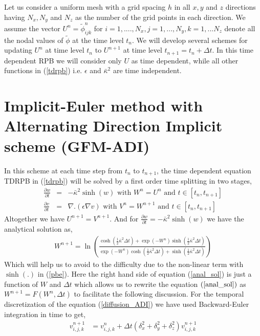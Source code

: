 Let us consider a uniform mesh with a grid spacing $h$ in all $x,y$ and $z$ directions having $N_x,N_y$ and $N_z$ as the number of the grid points in each direction. We assume the vector $U^n={\tilde\phi^n_{ijk}}$ for $i=1,...., N_x,j=1,...,N_y,k=1,...N_z$ denote all the nodal values of $\tilde\phi$ at the time level $t_n$. We will develop several schemes for updating $U^n$ at time level $t_n$ to $U^{n+1}$ at time level $t_{n+1}=t_n+ \Delta t $. In this time dependent RPB we will consider only $U$ as time dependent, while all other functions in (\ref{tdrpb}) i.e. $\epsilon$ and $\bar\kappa^2 $ are time independent. 
\section{Implicit-Euler method with Alternating Direction Implicit scheme (GFM-ADI)}\label{GFM-ADI_sec}

In this scheme at each time step from $t_n$ to $t_{n+1}$, the time dependent equation TDRPB in  (\ref{tdrpb}) will be solved by a first order time splitting in two stages, 
\begin{eqnarray}
  \frac{\partial w}{\partial t}&=& -\bar\kappa^2 \sinh(w) \text{ with } W^n=U^n\text{ and } t \in \left[t_n,t_{n+1}\right]\label{non_linear_ADI}\\
 \frac{\partial v}{\partial t}&=&  \nabla . (\epsilon\nabla v) \text{ with } V^n=W^{n+1}\text{ and } t \in \left[t_n,t_{n+1}\right]	 \label{diffusion_ADI}
\end{eqnarray}  
Altogether we have $U^{n+1}=V^{n+1}$. And for $ \frac{\partial w}{\partial t}= -\bar\kappa^2 \sinh(w)$ we have the analytical solution as, 	
	\begin{eqnarray}	
W^{n+1}= \ln \left( \frac{\cosh(\frac{1}{2}\bar\kappa^2\Delta t)+\exp(-W^n)\sinh(\frac{1}{2}\bar\kappa^2\Delta t)}{\exp(-W^n)\cosh(\frac{1}{2}\bar\kappa^2\Delta t)+\sinh(\frac{1}{2}\bar\kappa^2\Delta t)}\right)\label{anal_sol}
\end{eqnarray}
Which will help us to avoid to the difficulty due to the non-linear term with $\sinh(.)$ in (\ref{pbe}). Here the right hand side of equation (\ref{anal_sol}) is just a function of $W$ and $\Delta t$ which allows us to rewrite the equation $(\ref{anal_sol})$ as $W^{n+1}=F(W^n,\Delta t)$ to facilitate the following discussion. 
For the temporal discretization of the equation (\ref{diffusion_ADI}) we have used Backward-Euler integration in time to get, 
\begin{eqnarray}
	v_{i,j,k}^{n+1} &=v_{i,j,k}^{n}+\Delta t \left(\delta_x^2+\delta_y^2+\delta_z^2\right)v_{i,j,k}^{n+1} \label{imp-eu}
\end{eqnarray}	

